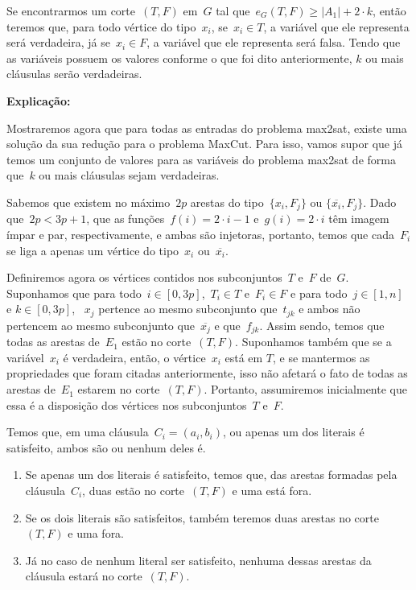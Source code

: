 		\bigskip
		\bigskip

		Se encontrarmos um corte~$(T,F)$ em~$G$ tal 
		que~${e_G(T, F)\ge |A_1| + 2\cdot k}$, 
		então teremos que, para todo vértice do tipo~$x_i$,
		se~${x_i\in T}$, a variável que ele representa será
		verdadeira, já se~${x_i\in F}$, a variável que ele representa
		será falsa. Tendo que as variáveis possuem os valores conforme
		o que foi dito anteriormente, $k$ ou mais cláusulas serão 
		verdadeiras.

		\bigskip
		\bigskip
		\bigskip
		\bigskip
		\bigskip

		\textbf{Explicação:}

		\bigskip

		Mostraremos agora que para todas as entradas do problema
		{\sc max2sat}, existe uma solução da sua redução para o problema
		MaxCut.
		Para isso, vamos supor que já temos um conjunto de valores
		para as variáveis do problema {\sc max2sat} de forma que~$k$ ou mais
		cláusulas sejam verdadeiras.

		Sabemos que existem no máximo~$2p$ arestas do 
		tipo~${\{x_i,F_j\}}$ ou ${\{\overline{x_i},F_j\}}$. Dado 
		que~${2p<3p+1}$,
		que as funções~${f(i)=2\cdot i - 1}$ e~${g(i)=2\cdot i}$ têm 
		imagem ímpar e par, respectivamente, e ambas são injetoras, 
		portanto, temos que cada~$F_i$ se liga a apenas um vértice
		do tipo~$x_i$ ou~${\overline{x_i}}$.

		Definiremos agora os vértices contidos nos 
		subconjuntos~$T$ e~$F$ de~$G$.
		Suponhamos que para todo~${i\in[0,3p]}$,~${T_i\in T}$ 
		e~${F_i\in F}$ e
		para todo~${j\in[1,n]}$ e ${k\in[0,3p]}$, ~$x_j$ pertence ao 
		mesmo subconjunto que~$t_{jk}$ e ambos não pertencem ao mesmo 
		subconjunto que~$\overline{x_j}$ e que~$f_{jk}$.
		Assim sendo, temos que todas as arestas de~$E_1$ estão no 
		corte~$(T,F)$.
		Suponhamos também que se a variável~$x_i$ é verdadeira,
		então, o vértice~$x_i$ está em $T$, e se mantermos as 
		propriedades que foram citadas anteriormente, isso não afetará o 
		fato de todas as arestas de~$E_1$ estarem no corte~$(T,F)$.
		Portanto, assumiremos inicialmente que essa é a disposição dos 
		vértices nos subconjuntos~$T$ e~$F$.

		Temos que, em uma cláusula~${C_i=(a_i,b_i)}$, ou
		apenas um dos literais é satisfeito, ambos são ou nenhum
		deles é.
		\begin{enumerate}
			\item Se apenas um dos literais é satisfeito, temos que,
			das arestas formadas pela cláusula~$C_i$, duas
			estão no corte~$(T,F)$ e uma está fora.
			\item Se os dois literais são satisfeitos, também teremos
			duas arestas no corte~$(T,F)$ e uma fora.
			\item Já no caso de nenhum literal ser satisfeito, nenhuma
			dessas arestas da cláusula estará no corte~$(T,F)$.
		\end{enumerate}

